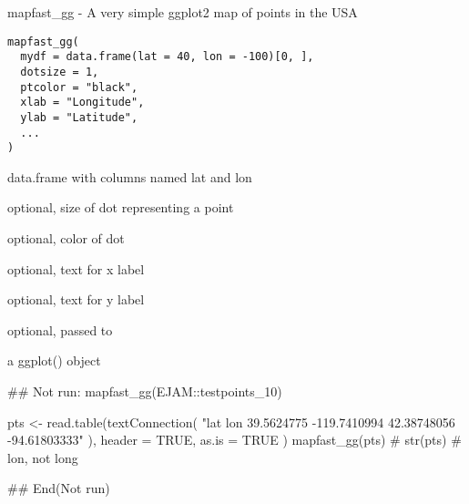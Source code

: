 \documentclass[a4paper]{book}
\begin{document}
%
\begin{Description}\relax
mapfast\_gg - A very simple ggplot2 map of points in the USA
\end{Description}
%
\begin{Usage}
\begin{verbatim}
mapfast_gg(
  mydf = data.frame(lat = 40, lon = -100)[0, ],
  dotsize = 1,
  ptcolor = "black",
  xlab = "Longitude",
  ylab = "Latitude",
  ...
)
\end{verbatim}
\end{Usage}
%
\begin{Arguments}
\begin{ldescription}
\item[\code{mydf}] data.frame with columns named lat and lon

\item[\code{dotsize}] optional, size of dot representing a point

\item[\code{ptcolor}] optional, color of dot

\item[\code{xlab}] optional, text for x label

\item[\code{ylab}] optional, text for y label

\item[\code{...}] optional, passed to 
\end{ldescription}
\end{Arguments}
%
\begin{Value}
a ggplot() object
\end{Value}
%
\begin{Examples}
\begin{ExampleCode}
## Not run: 
  mapfast_gg(EJAM::testpoints_10)
  
  pts <- read.table(textConnection(
  "lat lon 
  39.5624775 -119.7410994 
  42.38748056 -94.61803333"
  ),
  header = TRUE, 
  as.is = TRUE
  )
  mapfast_gg(pts)
  # str(pts) # lon, not long
  
## End(Not run)
  
\end{ExampleCode}
\end{Examples}
\end{document}
